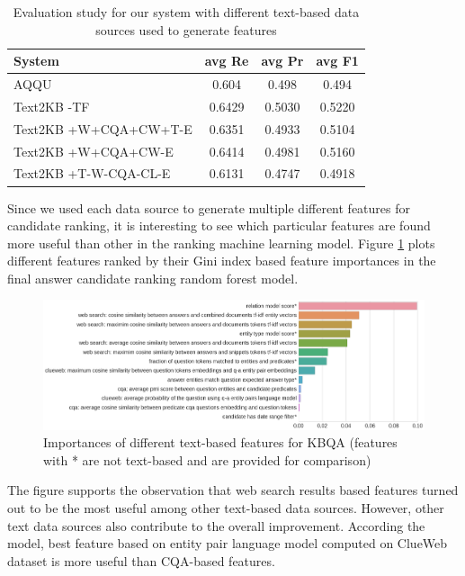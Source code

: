 \begin{table}
\caption{Evaluation study for our system with different text-based data sources used to generate features}
\label{table:ablation:other}
\begin{tabular}{| p{4cm} | c | c | c | }
\hline
System & avg Re & avg Pr &  avg F1 \\
\hline
AQQU & 0.604 & 0.498 & 0.494\\
Text2KB -TF & 0.6429 & 0.5030 & 0.5220 \\
\hline
Text2KB +W+CQA+CW+T-E & 0.6351 & 0.4933 & 0.5104 \\
Text2KB +W+CQA+CW-E & 0.6414 & 0.4981 & 0.5160 \\
Text2KB +T-W-CQA-CL-E & 0.6131 & 0.4747 & 0.4918 \\
\hline
\end{tabular}
\end{table}

Since we used each data source to generate multiple different features for candidate ranking, it is interesting to see which particular features are found more useful than other in the ranking machine learning model.
Figure \ref{fig:feature_importances} plots different features ranked by their Gini index based feature importances in the final answer candidate ranking random forest model.

\begin{figure}
\centering
\includegraphics[width=\textwidth]{img/feature_importances}
\caption{Importances of different text-based features for KBQA (features with * are not text-based and are provided for comparison)}
\label{fig:feature_importances}
\end{figure}

The figure supports the observation that web search results based features turned out to be the most useful among other text-based data sources.
However, other text data sources also contribute to the overall improvement.
According the model, best feature based on entity pair language model computed on ClueWeb dataset is more useful than CQA-based features.